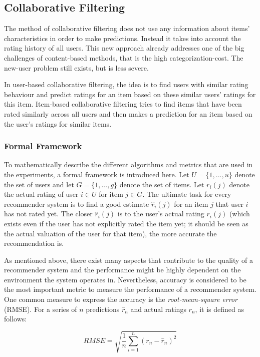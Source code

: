 \subsection{Collaborative Filtering}
\label{sst:collaborativefiltering} The method of collaborative filtering does not use any information about items' characteristics in order to make predictions. Instead it takes into account the rating history of all users. This new approach already addresses one of the big challenges of content-based methods, that is the high categorization-cost. The new-user problem still exists, but is less severe.

In user-based collaborative filtering, the idea is to find users with similar rating behaviour and predict ratings for an item based on these similar users' ratings for this item. Item-based collaborative filtering tries to find items that have been rated similarly across all users and then makes a prediction for an item based on the user's ratings for similar items.

\subsubsection{Formal Framework}
\label{ssst:formalframework} To mathematically describe the different algorithms and metrics that are used in the experiments, a formal framework is introduced here. Let $U = \{1,...,u\}$ denote the set of users and let $G = \{1,...,g\}$ denote the set of items. Let $r_i(j)$ denote the actual rating of user $i \in U$ for item $j \in G$. The ultimate task for every recommender system is to find a good estimate $\hat{r}_i(j)$ for an item $j$ that user $i$ has not rated yet. The closer $\hat{r}_i(j)$ is to the user's actual rating $r_i(j)$ (which exists even if the user has not explicitly rated the item yet; it should be seen as the actual valuation of the user for that item), the more accurate the recommendation is.

As mentioned above, there exist many aspects that contribute to the quality of a recommender system and the performance might be highly dependent on the environment the system operates in. Nevertheless, accuracy is considered to be the most important metric to measure the performance of a recommender system. One common measure to express the accuracy is the \textit{root-mean-square error} (RMSE). For a series of $n$ predictions $\hat{r}_n$ and actual ratings $r_n$, it is defined as follows:

\begin{equation}
RMSE = \sqrt{\frac{1}{n} \sum_{i=1}^{n}(r_n - \hat{r}_n)^2}
\label{eq:rmse}
\end{equation}

